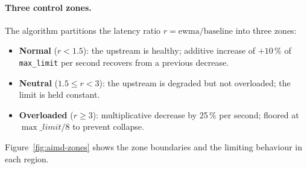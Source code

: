 \documentclass[a4paper, 11pt]{article}
\begin{document}
\paragraph{Three control zones.}  The algorithm partitions the latency ratio
$r = \text{ewma} / \text{baseline}$ into three zones:
\begin{itemize}
  \item \textbf{Normal} ($r < 1.5$): the upstream is healthy; additive increase
        of $+10\,\%$ of \texttt{max\_limit} per second recovers from a previous
        decrease.
  \item \textbf{Neutral} ($1.5 \leq r < 3$): the upstream is degraded but not
        overloaded; the limit is held constant.
  \item \textbf{Overloaded} ($r \geq 3$): multiplicative decrease by 25\,\%
        per second; floored at $\max\_limit/8$ to prevent collapse.
\end{itemize}
Figure~\ref{fig:aimd-zones} shows the zone boundaries and the limiting behaviour
in each region.
\end{document}
